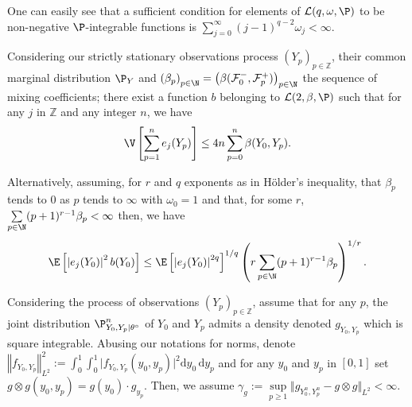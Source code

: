 One can easily see that a sufficient condition for elements of $\mathcal{L}(q, \omega, \P)$ to be non-negative $\P$-integrable functions is $\sum\limits_{j = 0}^{\infty} (j - 1)^{q-2} \omega_{j} < \infty$.

\begin{lm}\label{LM_DEPENDENTDATA_VARIANCEBOUNDII}
Considering our strictly stationary observations process $(Y_{p})_{p \in \mathds{Z}}$, their common marginal distribution $\P_{Y}$ and $\left(\beta_{p}\right)_{p \in \N} = \left(\beta(\mathcal{F}_{0}^{-}, \mathcal{F}_{p}^{+})\right)_{p \in \N}$ the sequence of mixing coefficients; there exist a function $b$ belonging to $\mathcal{L}(2, \beta, \P)$ such that for any $j$ in $\mathds{Z}$ and any integer $n$, we have
\[\V\left[\sum\limits_{p = 1}^{n} e_{j}(Y_{p})\right] \leq 4 n \sum\limits_{p = 0}^{n} \beta(Y_{0}, Y_{p}).\]

Alternatively, assuming, for $r$ and $q$ exponents as in Hölder's inequality, that $\beta_{p}$ tends to $0$ as $p$ tends to $\infty$ with $\omega_{0} = 1$ and that, for some $r$, $\sum\limits_{p \in \N} (p+1)^{r-1} \beta_{p} < \infty$ then, we have
\[\E\left[\left\vert e_{j}(Y_{0})\right\vert^{2} b(Y_{0})\right] \leq \E\left[\left\vert e_{j}(Y_{0})\right\vert^{2q}\right]^{1/q} \left(r \sum\limits_{p \in \N} (p+1)^{r-1} \beta_{p}\right)^{1/r}.\]
\end{lm}

\begin{as}\label{AS_DEPENDENTDATA_MARGINS}
Considering the process of observations $(Y_{p})_{p \in \mathds{Z}}$, assume that for any $p$, the joint distribution $\P_{Y_{0}, Y_{p} \vert \theta^{\circ}}^{n}$ of $Y_{0}$ and $Y_{p}$ admits a density denoted $g_{Y_{0}, Y_{p}}$ which is square integrable.
Abusing our notations for norms, denote
$\left\Vert f_{Y_{0}, Y_{p}}\right\Vert_{L^{2}}^{2} := \int_{0}^{1}\int_{0}^{1} \vert f_{Y_{0}, Y_{p}}(y_{0}, y_{p})\vert^{2}
\text{d}\!y_{0} \, \text{d}\!y_{p}$ and for any $y_{0}$ and $y_{p}$ in $[0, 1]$ set $g \otimes g(y_{0}, y_{p}) = g(y_{0}) \cdot g_{y_{p}}$.
Then, we assume $\gamma_{g} := \sup\limits_{p \geq 1} \Vert g_{Y_{0}^{n}, Y_{p}^{n}} - g \otimes g \Vert_{L^{2}} < \infty$.
\end{as}

